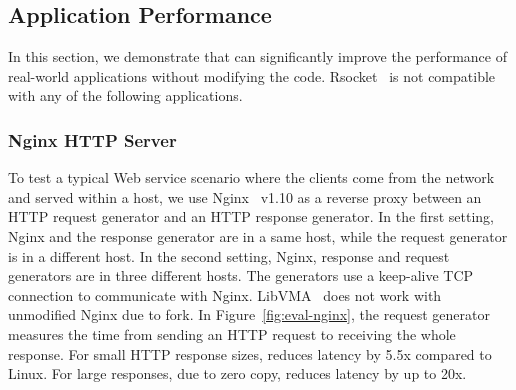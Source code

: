 \subsection{Application Performance}
\label{subsec:application}

In this section, we demonstrate that \sys{} can significantly improve the performance of real-world applications without modifying the code.
Rsocket~\cite{rsockets} is not compatible with any of the following applications.

\subsubsection{Nginx HTTP Server}
\quad

To test a typical Web service scenario where the clients come from the network and served within a host, we use Nginx~\cite{nginx} v1.10 as a reverse proxy between an HTTP request generator and an HTTP response generator.
In the first setting, Nginx and the response generator are in a same host, while the request generator is in a different host.
In the second setting, Nginx, response and request generators are in three different hosts.
The generators use a keep-alive TCP connection to communicate with Nginx.
LibVMA~\cite{libvma} does not work with unmodified Nginx due to fork.
In Figure~\ref{fig:eval-nginx}, the request generator measures the time from sending an HTTP request to receiving the whole response.
For small HTTP response sizes, \sys{} reduces latency by 5.5x compared to Linux.
For large responses, due to zero copy, \sys{} reduces latency by up to 20x.







